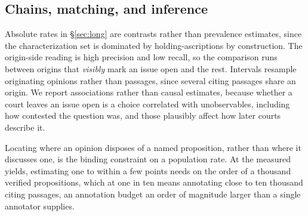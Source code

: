 \subsection{Chains, matching, and inference} Absolute rates in \S\ref{sec:long}
are contrasts rather than prevalence estimates, since the characterization set is
dominated by holding-ascriptions by construction. The origin-side reading is high
precision and low recall, so the comparison runs between origins that
\emph{visibly} mark an issue open and the rest. Intervals resample originating
opinions rather than passages, since several citing passages share an origin. We
report associations rather than causal estimates, because whether a court leaves
an issue open is a choice
correlated with unobservables, including how contested the question was, and those
plausibly affect how later courts describe it.

Locating where an opinion disposes of a named proposition, rather than where it
discusses one, is the binding constraint on a population rate. At the measured
yields, estimating one to within a few points needs on the order of a thousand
verified propositions, which at one in ten means annotating close to ten thousand
citing passages, an annotation budget an order of magnitude larger than a single
annotator supplies.
